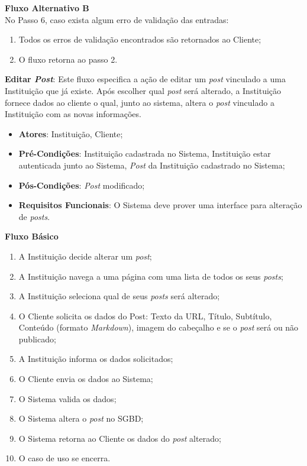 \begin{lista}
    \textbf{Fluxo Alternativo B} \\
    No Passo 6, caso exista algum erro de validação das entradas:
    \begin{enumerate}
    \item Todos os erros de validação encontrados são retornados ao Cliente;
    \item O fluxo retorna ao passo 2.
    \end{enumerate}
  
  
  
  \item \textbf{Editar \emph{Post}}: Este fluxo especifica a ação de editar um \emph{post} vinculado a uma Instituição que já existe. Após escolher qual \emph{post} será alterado, a Instituição fornece dados ao cliente o qual, junto ao sistema, altera o \emph{post} vinculado a Instituição com as novas informações.
    \begin{itemize}
    \item \textbf{Atores}: Instituição, Cliente;
    \item \textbf{Pré-Condições}: Instituição cadastrada no Sistema, Instituição estar autenticada junto ao Sistema, \emph{Post} da Instituição cadastrado no Sistema;
    \item \textbf{Pós-Condições}: \emph{Post} modificado;
    \item \textbf{Requisitos Funcionais}: O Sistema deve prover uma interface para alteração de \emph{posts}.
    \end{itemize}
	
    \textbf{Fluxo Básico}
    \begin{enumerate}
    \item A Instituição decide alterar um \emph{post};
    \item A Instituição navega a uma página com uma lista de todos os seus \emph{posts};
    \item A Instituição seleciona qual de seus \emph{posts} será alterado;
    \item O Cliente solicita os dados do Post: Texto da URL, Título, Subtítulo, Conteúdo (formato \emph{Markdown}), imagem do cabeçalho e se o \emph{post} será ou não publicado;
    \item A Instituição informa os dados solicitados;
    \item O Cliente envia os dados ao Sistema;
    \item O Sistema valida os dados;
    \item O Sistema altera o \emph{post} no SGBD;
    \item O Sistema retorna ao Cliente os dados do \emph{post} alterado;
    \item O caso de uso se encerra.
    \end{enumerate}
    

\end{lista}
